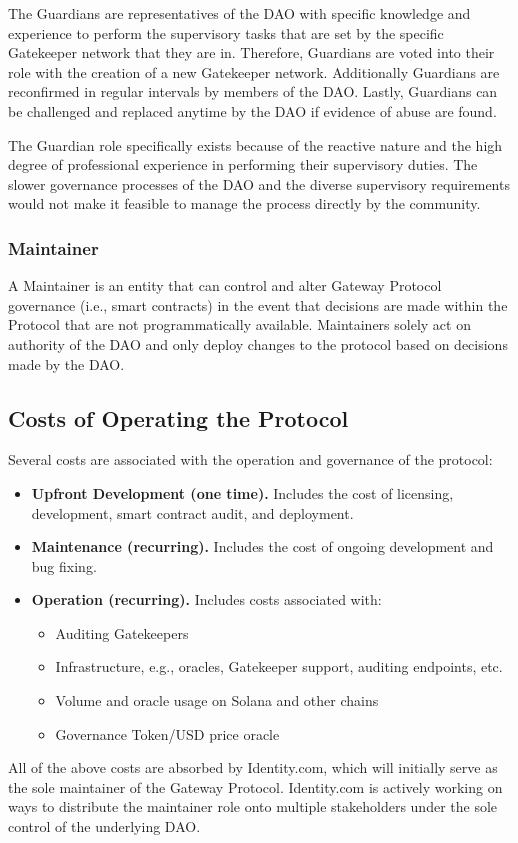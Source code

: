 The Guardians are representatives of the DAO with specific knowledge and experience to perform the supervisory tasks that
are set by the specific Gatekeeper network that they are in. Therefore, Guardians are voted into their role with the creation
of a new Gatekeeper network. Additionally Guardians are reconfirmed in regular intervals by members of the DAO. Lastly,
Guardians can be challenged and replaced anytime by the DAO if evidence of abuse are found.

The Guardian role specifically exists because of the reactive nature and the high degree of professional experience in performing
their supervisory duties. The slower governance processes of the DAO and the diverse supervisory requirements would not
make it feasible to manage the process directly by the community.

\subsubsection{Maintainer}
A Maintainer is an entity that can control and alter Gateway Protocol governance (i.e., smart contracts) in the event that decisions are made within the Protocol that are not programmatically available.
Maintainers solely act on authority of the DAO and only deploy changes to the protocol based on decisions made by the DAO.

\subsection{Costs of Operating the Protocol}
Several costs are associated with the operation and governance of the protocol:

\begin{itemize}
\item \textbf{Upfront Development (one time).} Includes the cost of licensing, development, smart contract audit, and deployment.
\item \textbf{Maintenance (recurring).} Includes the cost of ongoing development and bug fixing.
\item \textbf{Operation (recurring).} Includes costs associated with:
\begin{itemize}
\item Auditing Gatekeepers
\item Infrastructure, e.g., oracles, Gatekeeper support, auditing endpoints, etc.
\item Volume and oracle usage on Solana and other chains
\item Governance Token/USD price oracle
\end{itemize}
\end{itemize}

All of the above costs are absorbed by Identity.com, which will initially serve as the sole maintainer of the Gateway Protocol. Identity.com is actively working on ways to distribute the maintainer role onto multiple stakeholders under the sole control of the underlying DAO.